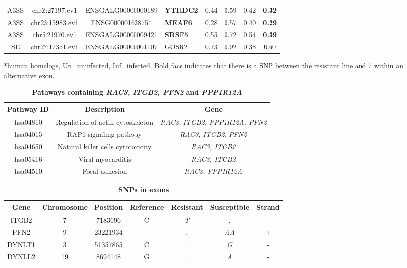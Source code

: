 \documentclass[10pt]{article}
\begin{document}
\begin{table}[!ht]
\begin{tabular}{cccp{2cm}cccc}
A3SS & chrZ:27197.ev1 & ENSGALG00000000189 & \textbf{YTHDC2} & 0.44 & 0.59 & 0.42 & \textbf{0.32} \\
A3SS & chr23:15983.ev1 & ENSG00000163875* & \textbf{MEAF6} & 0.28 & 0.57 & 0.40 & \textbf{0.29} \\
A3SS & chr5:21970.ev1 & ENSGALG00000009421 & \textbf{SRSF5} & 0.55 & 0.72 & 0.54 & \textbf{0.39} \\
\hline
SE & chr27:17351.ev1 & ENSGALG00000001107 & GOSR2 & 0.73 & 0.92 & 0.38 & 0.60 \\
\hline
\end{tabular}
\begin{flushleft}
    *human homologs, Un=uninfected, Inf=infected.
    Bold face indicates that there is a SNP between the resistant
    line and 7 within an alternative exon.
\end{flushleft}
\label{tab:line67i_diff_line67u_three}
\end{table}

\begin{table}[!ht]
\caption{
\bf{Pathways containing {\em RAC3, ITGB2, PFN2} and {\em PPP1R12A}}}
\begin{tabular}{ccc}
\hline
Pathway ID &  Description & Gene \\
\hline
hsa04810 & Regulation of actin cytoskeleton & {\em RAC3, ITGB2, PPP1R12A, PFN2} \\
hsa04015 & RAP1 signaling pathway & {\em RAC3, ITGB2, PFN2} \\
hsa04650 & Natural killer cells cytotoxicity & {\em RAC3, ITGB2} \\
hsa05416 & Viral myocarditis & {\em RAC3, ITGB2} \\
hsa04510 & Focal adhesion & {\em RAC3, PPP1R12A} \\
\hline
\end{tabular}
\begin{flushleft}
\end{flushleft}
\label{tab:integrin}
\end{table}

\begin{table}[!ht]
\caption{
\bf{SNPs in exons}}
\begin{tabular}{ccccccc}
\hline
Gene &  Chromosome & Position & Reference & Resistant & Susceptible & Strand \\
\hline
ITGB2 & 7 & 7183696 & C & {\em T} & . & - \\
PFN2 & 9 & 23221934 & -  - & . & {\em AA} & + \\
DYNLT1 & 3 & 51357865 & C & . & {\em G} & - \\
DYNLL2 & 19 & 8694148 & G & . & {\em A} & - \\
\hline
\end{tabular}
\begin{flushleft}
\end{flushleft}
\label{tab:deu_snps}
\end{table}
\end{document}
